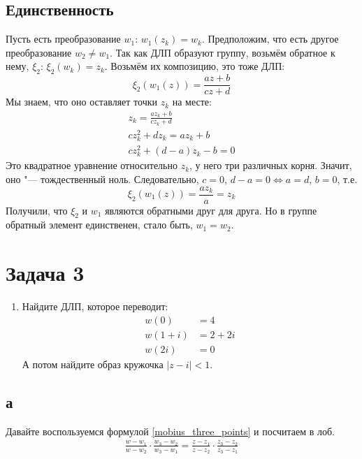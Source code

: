 	\subsection{Единственность}
		Пусть есть преобразование $w_1$: $w_1(z_k)=w_k$.
		Предположим, что есть другое преобразование $w_2 \neq w_1$.
		Так как ДЛП образуют группу, возьмём обратное к нему, $\xi_2$: $\xi_2(w_k)=z_k$.
		Возьмём их композицию, это тоже ДЛП:
		\[ \xi_2(w_1(z)) = \frac{az+b}{cz+d} \]
		Мы знаем, что оно оставляет точки $z_k$ на месте:
		\begin{gather*}
			z_k = \frac{az_k+b}{cz_k+d} \\
			cz_k^2+dz_k = az_k+b \\
			cz_k^2+(d-a)z_k - b = 0
		\end{gather*}
		Это квадратное уравнение относительно $z_k$, у него три различных корня.
		Значит, оно "--- тождественный ноль.
		Следовательно, $c=0$, $d-a=0 \iff a = d$, $b=0$, т.е. 
		\[ \xi_2(w_1(z)) = \frac{az_k}{a} = z_k \]
		Получили, что $\xi_2$ и $w_1$ являются обратными друг для друга.
		Но в группе обратный элемент единственен, стало быть, $w_1=w_2$.

\section{Задача 3}
	\begin{enumerate}[label=\asbuk{enumi}.]
		\item
			Найдите ДЛП, которое переводит:
			\begin{align*}
				w(0) &= 4\\
				w(1+i) &= 2+2i\\
				w(2i) &= 0
			\end{align*}
			А потом найдите образ кружочка $|z-i|<1$.
	\end{enumerate}

	\subsection{а}
		Давайте воспользуемся формулой \ref{mobius_three_points} и посчитаем в лоб.
		\begin{gather*}
			\frac{w-w_1}{w-w_2} \cdot \frac{w_3-w_2}{w_3-w_1} = \frac{z-z_1}{z-z_2} \cdot \frac{z_3-z_2}{z_3-z_1} \\
			\begin{aligned}
			\end{aligned}
		\end{gather*}
		\TODO

